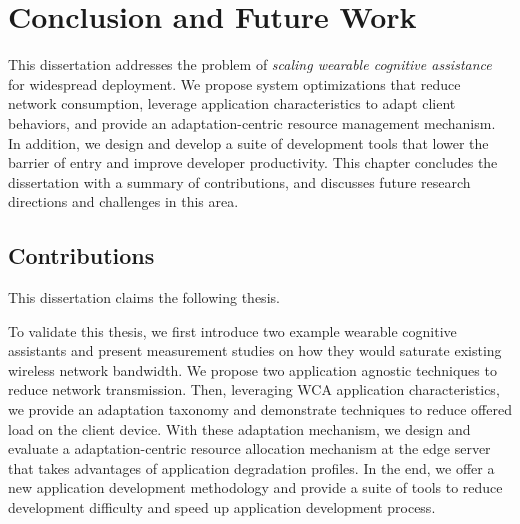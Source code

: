 \chapter{Conclusion and Future Work}
\label{chapter: conclusion}

This dissertation addresses the problem of \textit{scaling wearable cognitive
assistance} for widespread deployment. We propose system optimizations that
reduce network consumption, leverage application characteristics to adapt client
behaviors, and provide an adaptation-centric resource management mechanism. In
addition, we design and develop a suite of development tools that lower the
barrier of entry and improve developer productivity. This chapter concludes the
dissertation with a summary of contributions, and discusses future research
directions and challenges in this area.

\section{Contributions}

This dissertation claims the following thesis.

\noindent{}

To validate this thesis, we first introduce two example wearable cognitive
assistants and present measurement studies on how they would saturate existing
wireless network bandwidth. We propose two application agnostic techniques to
reduce network transmission. Then, leveraging WCA application characteristics,
we provide an adaptation taxonomy and demonstrate techniques to reduce offered
load on the client device. With these adaptation mechanism, we design and
evaluate a adaptation-centric resource allocation mechanism at the edge server
that takes advantages of application degradation profiles. In the end, we offer
a new application development methodology and provide a suite of tools to reduce
development difficulty and speed up application development process.

